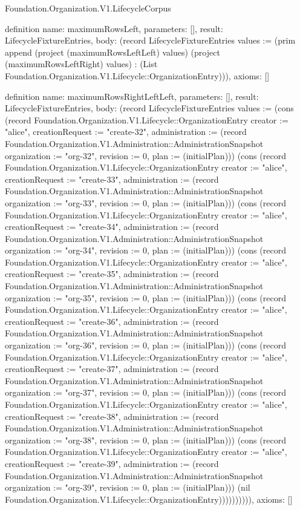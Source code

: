 \begin{lexlean}{Foundation.Organization.V1.LifecycleCorpus}
\begin{semanticmodule}
definition{
  name: maximumRowsLeft,
  parameters: [],
  result: LifecycleFixtureEntries,
  body: (record LifecycleFixtureEntries {values := (prim append (project (maximumRowsLeftLeft) values) (project (maximumRowsLeftRight) values) : (List Foundation.Organization.V1.Lifecycle::OrganizationEntry))}),
  axioms: []
}

definition{
  name: maximumRowsRightLeftLeft,
  parameters: [],
  result: LifecycleFixtureEntries,
  body: (record LifecycleFixtureEntries {values := (cons (record Foundation.Organization.V1.Lifecycle::OrganizationEntry {creator := "alice", creationRequest := "create-32", administration := (record Foundation.Organization.V1.Administration::AdministrationSnapshot {organization := "org-32", revision := 0, plan := (initialPlan)})}) (cons (record Foundation.Organization.V1.Lifecycle::OrganizationEntry {creator := "alice", creationRequest := "create-33", administration := (record Foundation.Organization.V1.Administration::AdministrationSnapshot {organization := "org-33", revision := 0, plan := (initialPlan)})}) (cons (record Foundation.Organization.V1.Lifecycle::OrganizationEntry {creator := "alice", creationRequest := "create-34", administration := (record Foundation.Organization.V1.Administration::AdministrationSnapshot {organization := "org-34", revision := 0, plan := (initialPlan)})}) (cons (record Foundation.Organization.V1.Lifecycle::OrganizationEntry {creator := "alice", creationRequest := "create-35", administration := (record Foundation.Organization.V1.Administration::AdministrationSnapshot {organization := "org-35", revision := 0, plan := (initialPlan)})}) (cons (record Foundation.Organization.V1.Lifecycle::OrganizationEntry {creator := "alice", creationRequest := "create-36", administration := (record Foundation.Organization.V1.Administration::AdministrationSnapshot {organization := "org-36", revision := 0, plan := (initialPlan)})}) (cons (record Foundation.Organization.V1.Lifecycle::OrganizationEntry {creator := "alice", creationRequest := "create-37", administration := (record Foundation.Organization.V1.Administration::AdministrationSnapshot {organization := "org-37", revision := 0, plan := (initialPlan)})}) (cons (record Foundation.Organization.V1.Lifecycle::OrganizationEntry {creator := "alice", creationRequest := "create-38", administration := (record Foundation.Organization.V1.Administration::AdministrationSnapshot {organization := "org-38", revision := 0, plan := (initialPlan)})}) (cons (record Foundation.Organization.V1.Lifecycle::OrganizationEntry {creator := "alice", creationRequest := "create-39", administration := (record Foundation.Organization.V1.Administration::AdministrationSnapshot {organization := "org-39", revision := 0, plan := (initialPlan)})}) (nil Foundation.Organization.V1.Lifecycle::OrganizationEntry)))))))))}),
  axioms: []
}


\end{semanticmodule}
\end{lexlean}
